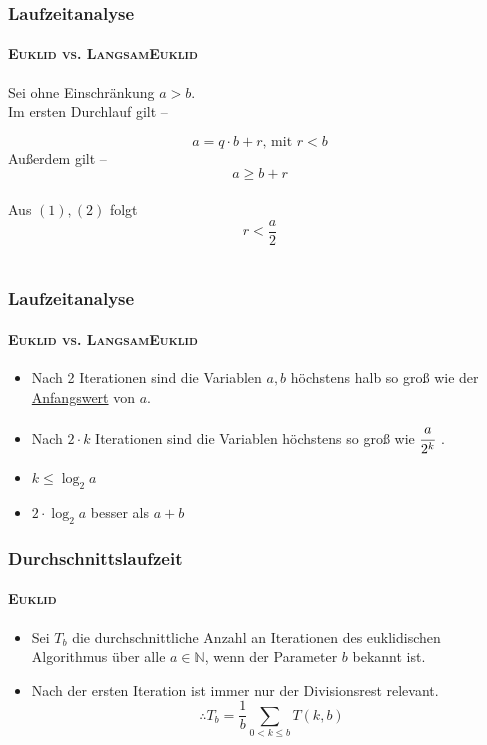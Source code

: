 \documentclass[•]{beamer}
\begin{document}
\begin{frame}
	\frametitle{Laufzeitanalyse}
	\framesubtitle{\textsc{Euklid vs. LangsamEuklid}}
	Sei ohne Einschr\"ankung $a>b$.\\ Im ersten Durchlauf gilt --
	
	\begin{equation}a = q \cdot b + r \text{, mit } r < b
	\end{equation}
	 Au{\ss}erdem gilt -- \\ \begin{equation}a \geq b + r \end{equation} \\
	 Aus $(1), (2)$ folgt $$r < \frac{a}{2}$$ \\
\end{frame}	
\begin{frame}
	\frametitle{Laufzeitanalyse}
	\framesubtitle{\textsc{Euklid vs. LangsamEuklid}}
	\begin{itemize}
	\item Nach 2 Iterationen sind die Variablen $a,b$ h\"ochstens halb so gro{\ss} wie der \underline{Anfangswert} von $a$. \vspace{15pt}
	\item Nach $2 \cdot k$ Iterationen sind die Variablen h\"ochstens so gro{\ss} wie $\cfrac{a}{2^k}$ \vspace{15pt} .	
	\item $k \leq \log_{2}a$
	\item $2\cdot \log_{2}a$ besser als $a+b$
	\end{itemize}
\end{frame}

\begin{frame}
	\frametitle{Durchschnittslaufzeit}
	\framesubtitle{\textsc{Euklid}}
	\begin{itemize}
	\item Sei $T_{b}$ die durchschnittliche Anzahl an Iterationen des euklidischen Algorithmus \"uber alle $a \in \mathbb{N}$, wenn der Parameter $b$ bekannt ist.
	\item Nach der ersten Iteration ist immer nur der Divisionsrest relevant.
	$$\therefore T_{b} = \frac{1}{b} \sum_{0 < k\leq b} T(k,b)$$
	\end{itemize}
	\end{frame}
\end{document}
